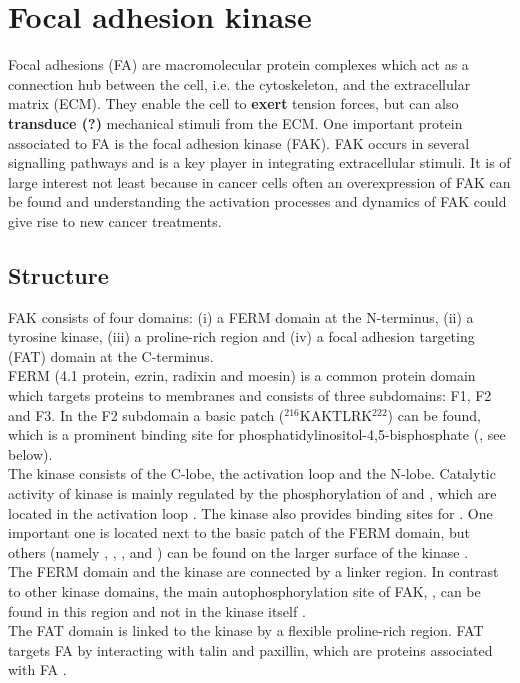 \section{Focal adhesion kinase}
Focal adhesions (FA) are macromolecular protein complexes which act as a connection hub between the cell, i.e. the cytoskeleton, and the extracellular matrix (ECM). They enable the cell 
to {\bf exert} tension forces, but can also {\bf transduce (?)} mechanical stimuli from the ECM. %
One important protein associated to FA is the focal adhesion kinase (FAK). FAK occurs in several signalling pathways and is a key player in integrating extracellular stimuli. It is of large interest not least because in cancer cells often an overexpression of FAK can be found and understanding the activation processes and dynamics of FAK could give rise to new cancer treatments.%
\subsection{Structure}
FAK consists of four domains: (i) a FERM domain at the N-terminus, (ii) a tyrosine kinase, (iii) a proline-rich region and (iv) a focal adhesion targeting (FAT) domain at the C-terminus.\\
FERM (4.1 protein, ezrin, radixin and moesin) is a common protein domain which targets proteins to membranes \autocite{fermdomain} and consists of three subdomains: F1, F2 and F3. In the F2 subdomain a basic patch ($^{216}$KAKTLRK$^{222}$) can be found, which is a prominent binding site for phosphatidylinositol-4,5-bisphosphate (\pip, see below).\\
The kinase consists of the C-lobe, the activation loop and the N-lobe. Catalytic activity of kinase is mainly regulated by the phosphorylation of  and , which are located in the activation loop \autocite{tyrosinePhosphor}. The kinase also provides binding sites for \pip{}. One important one is located next to the basic patch of the FERM domain, but others (namely , , ,  and ) can be found on the larger surface of the kinase \autocites{pap002}{pap002Exp}.\\
The FERM domain and the kinase are connected by a linker region. In contrast to other kinase domains, the main autophosphorylation site of FAK, , can be found in this region and not in the kinase itself \autocite{pap001}.\\ %
The FAT domain is linked to the kinase by a flexible proline-rich region. FAT targets FA by interacting with talin and paxillin, which are proteins associated with FA \autocite{fatdomain}.
